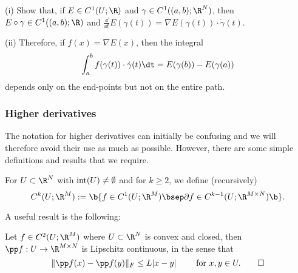 \begin{exercise}
  (i) Show that, if $E \in C^1(U; \R)$ and $\gamma \in C^1((a, b);
  \R^N)$, then $E \circ \gamma \in C^1((a,b); \R)$ and $\frac{\dd}{\dd
    t} E(\gamma(t)) = \nabla E(\gamma(t)) \cdot \dot\gamma(t)$.

  (ii) Therefore, if $f(x) = \nabla E(x)$, then the integral
  \begin{displaymath}
    \int_a^b f(\gamma(t)) \cdot \dot\gamma(t) \dt = E(\gamma(b)) - E(\gamma(a))
  \end{displaymath}
  depends only on the end-points but not on the entire path.

\end{exercise}


\subsubsection{Higher derivatives}
%
The notation for higher derivatives can initially be confusing and we
will therefore avoid their use as much as possible. However, there are
some simple definitions and results that we require.


For $U \subset \R^N$ with ${\rm int}(U) \neq \emptyset$ and for $k
\geq 2$, we define (recursively)
\begin{displaymath}
  C^k(U; \R^M) := \b\{ f \in C^1(U; \R^M) \bsep \partial f \in
  C^{k-1}(U; \R^{M \times N}) \b\}.
\end{displaymath}

A useful result is the following:

\begin{exercise}
  Let $f \in C^2(U; \R^M)$ where $U \subset \R^N$ is convex and
  closed, then $\pp f : U \to \R^{M \times N}$ is Lipschitz
  continuous, in the sense that
  \begin{displaymath}
    \| \pp f(x) - \pp f(y) \|_F \leq L |x - y| \qquad \text{ for } x,
    y \in U. \qedhere
  \end{displaymath}
\end{exercise}

